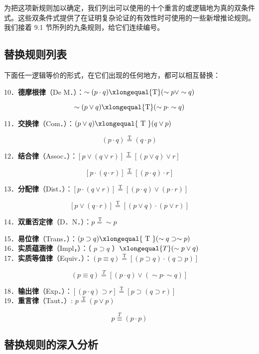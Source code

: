 为把这项新规则加以确定，我们列出可以使用的十个重言的或逻辑地为真的双条件式。这些双条件式提供了在证明复杂论证的有效性时可使用的一些新增推论规则。我们接着 9.1 节所列的九条规则，给它们连续编号。

\subsection{替换规则列表}

下面任一逻辑等价的形式，在它们出现的任何地方，都可以相互替换：

10．\textbf{德摩根律}（De M．）：$\sim(p \cdot q) \xlongequal{\mathrm{T}}(\sim p \vee \sim q)$

$$
\sim(p \vee q) \xlongequal{\mathrm{T}}(\sim p \cdot \sim q)
$$

11．\textbf{交换律}（Com．）：$(p \vee q) \xlongequal{\text { T }}(q \vee p)$

$$
(p \cdot q) \stackrel{\mathrm{T}}{=}(q \cdot p)
$$

12．\textbf{结合律}（Assoc．）：$[p \vee(q \vee r)] \stackrel{\mathrm{T}}{=}[(p \vee q) \vee r]$

$$
[p \cdot(q \cdot r)] \stackrel{\mathrm{T}}{=}[(p \cdot q) \cdot r]
$$

13．\textbf{分配律}（Dist．）：$[p \cdot(q \vee r)] \stackrel{\mathrm{T}}{=}[(p \cdot q) \vee(p \cdot r)]$

$$
[p \vee(q \cdot r)] \stackrel{\mathrm{T}}{=}[(p \vee q) \cdot(p \vee r)]
$$

14．\textbf{双重否定律}（D．N．）：$p \stackrel{\mathrm{~T}}{=} \sim p$

15．\textbf{易位律}（Trans．）：$(p \supset q) \xlongequal{\text { T }}(\sim q \supset \sim p)$\\
16．\textbf{实质蕴涵律}（Impl，）：（ $p \supset q$ ）$\xlongequal{T}(\sim p \vee q)$\\
17．\textbf{实质等值律}（Equiv．）：$(p \equiv q) \stackrel{\mathrm{T}}{=}[(p \supset q) \cdot(q \supset p)]$

$$
(p \equiv q) \stackrel{T}{=}[(p \cdot q) \vee(\sim p \cdot \sim q)]
$$

18．\textbf{输出律}（Exp．）：$[(p \cdot q) \supset r] \stackrel{\mathrm{T}}{=}[p \supset(q \supset r)]$\\
19．\textbf{重言律}（Taut．）\cite{wittgenstein1922}: $p \stackrel{\mathrm{~T}}{=}(p \vee p)$

$$
p \stackrel{T}{\equiv}(p \cdot p)
$$

\subsection{替换规则的深入分析}

